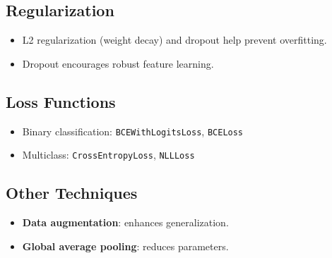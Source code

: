 \subsection{Regularization}
\begin{itemize}
    \item L2 regularization (weight decay) and dropout help prevent overfitting.
    \item Dropout encourages robust feature learning.
\end{itemize}

\subsection{Loss Functions}
\begin{itemize}
    \item Binary classification: \texttt{BCEWithLogitsLoss}, \texttt{BCELoss}
    \item Multiclass: \texttt{CrossEntropyLoss}, \texttt{NLLLoss}
\end{itemize}

\subsection{Other Techniques}
\begin{itemize}
    \item \textbf{Data augmentation}: enhances generalization.
    \item \textbf{Global average pooling}: reduces parameters.
\end{itemize}